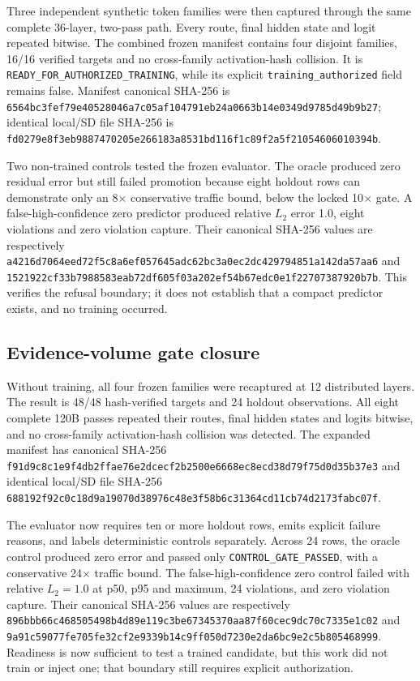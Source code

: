 Three independent synthetic token families were then captured through the
same complete 36-layer, two-pass path.  Every route, final hidden state and
logit repeated bitwise.  The combined frozen manifest contains four disjoint
families, 16/16 verified targets and no cross-family activation-hash collision.
It is \texttt{READY\_FOR\_AUTHORIZED\_TRAINING}, while its explicit
\texttt{training\_authorized} field remains false.  Manifest canonical SHA-256
is
\texttt{6564bc3fef79e40528046a7c05af104791eb24a0663b14e0349d9785d49b9b27};
identical local/SD file SHA-256 is
\texttt{fd0279e8f3eb9887470205e266183a8531bd116f1c89f2a5f21054606010394b}.

Two non-trained controls tested the frozen evaluator.  The oracle produced
zero residual error but still failed promotion because eight holdout rows can
demonstrate only an 8$\times$ conservative traffic bound, below the locked
10$\times$ gate.  A false-high-confidence zero predictor produced relative
$L_2$ error 1.0, eight violations and zero violation capture.  Their canonical
SHA-256 values are respectively
\texttt{a4216d7064eed72f5c8a6ef057645adc62bc3a0ec2dc429794851a142da57aa6}
and
\texttt{1521922cf33b7988583eab72df605f03a202ef54b67edc0e1f22707387920b7b}.
This verifies the refusal boundary; it does not establish that a compact
predictor exists, and no training occurred.

\subsection{Evidence-volume gate closure}

Without training, all four frozen families were recaptured at 12 distributed
layers.  The result is 48/48 hash-verified targets and 24 holdout observations.
All eight complete 120B passes repeated their routes, final hidden states and
logits bitwise, and no cross-family activation-hash collision was detected.
The expanded manifest has canonical SHA-256
\texttt{f91d9c8c1e9f4db2ffae76e2dcecf2b2500e6668ec8ecd38d79f75d0d35b37e3}
and identical local/SD file SHA-256
\texttt{688192f92c0c18d9a19070d38976c48e3f58b6c31364cd11cb74d2173fabc07f}.

The evaluator now requires ten or more holdout rows, emits explicit failure
reasons, and labels deterministic controls separately.  Across 24 rows, the
oracle control produced zero error and passed only
\texttt{CONTROL\_GATE\_PASSED}, with a conservative 24$\times$ traffic bound.
The false-high-confidence zero control failed with relative $L_2=1.0$ at
p50, p95 and maximum, 24 violations, and zero violation capture.  Their
canonical SHA-256 values are respectively
\texttt{896bbb66c468505498b4d89e119c3be67345370aa87f60cec9dc70c7335e1c02}
and
\texttt{9a91c59077fe705fe32cf2e9339b14c9ff050d7230e2da6bc9e2c5b805468999}.
Readiness is now sufficient to test a trained candidate, but this work did not
train or inject one; that boundary still requires explicit authorization.

